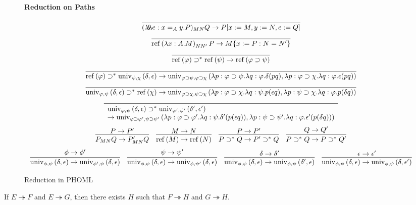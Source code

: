 \documentclass[a4paper,UKenglish]{lipics-v2016}
\newcommand*{\reff}[1]{\ensuremath{\mathrm{ref} \left( {#1} \right)}}
\newcommand*{\univ}[4]{\ensuremath{\mathrm{univ}_{{#1}, {#2}} \left({#3} , {#4} \right)}}
\newcommand*{\triplelambda}{\ensuremath{\lambda \!\! \lambda \!\! \lambda}}
\theoremstyle{plain}
\theoremstyle{definition}
\begin{document}
\begin{definition}
\begin{figure}
\paragraph*{Reduction on Paths}
$$\infer{(\triplelambda e:x =_A y.P)_{MN} Q \rightarrow P [x := M, y := N, e := Q]}{} $$
$$ \infer{\reff{\lambda x:A.M}_{N N'} P \rightarrow M \{ x:=P : N = N' \}}{} $$
$$ \infer{\reff{\varphi} \supset^* \reff{\psi} \rightarrow \reff{\varphi \supset \psi}}{} $$
$$ \infer{\reff{\varphi} \supset^* \univ{\psi}{\chi}{\delta}{\epsilon} \rightarrow 
\univ{\varphi \supset \psi}{\varphi \supset \chi}{\lambda p:\varphi \supset \psi. \lambda q : \varphi. \delta (pq)}{\lambda p : \varphi \supset \chi. \lambda q : \varphi. \epsilon (pq)}}{} $$
$$ \infer{\univ{\varphi}{\psi}{\delta}{\epsilon} \supset^* \reff{\chi} \rightarrow
\univ{\varphi \supset \chi}{\psi \supset \chi}{\lambda p : \varphi \supset \chi. \lambda q : \psi. p (\epsilon q)}{\lambda p:\psi \supset \chi. \lambda q : \varphi. p(\delta q)}}{} $$
$$ \infer{\begin{array}{l}
\univ{\varphi}{\psi}{\delta}{\epsilon} \supset^* \univ{\varphi'}{\psi'}{\delta'}{\epsilon'} \\
 \rightarrow
\univ{\varphi \supset \varphi'}{\psi \supset \psi'}{\lambda p : \varphi \supset \varphi'. \lambda q : \psi. \delta' (p(\epsilon q))}{\lambda p : \psi \supset \psi'. \lambda q : \varphi. \epsilon' (p (\delta q))}
\end{array}}{} $$
$$ \infer{P_{MN} Q \rightarrow P'_{MN} Q}{P \rightarrow P'} \quad
\infer{\reff{M} \rightarrow \reff{N}}{M \rightarrow N} \quad
\infer{P \supset^* Q \rightarrow P' \supset^* Q}{P \rightarrow P'} \quad
\infer{P \supset^* Q \rightarrow P \supset^* Q'}{Q \rightarrow Q'} $$
$$ \infer{\univ{\phi}{\psi}{\delta}{\epsilon} \rightarrow \univ{\phi'}{\psi}{\delta}{\epsilon}}{\phi \rightarrow \phi'}
\quad
\infer{\univ{\phi}{\psi}{\delta}{\epsilon} \rightarrow \univ{\phi}{\psi'}{\delta}{\epsilon}}{\psi \rightarrow \psi'}
\quad
\infer{\univ{\phi}{\psi}{\delta}{\epsilon} \rightarrow \univ{\phi}{\psi}{\delta'}{\epsilon}}{\delta \rightarrow \delta'}
\quad
\infer{\univ{\phi}{\psi}{\delta}{\epsilon} \rightarrow \univ{\phi}{\psi}{\delta}{\epsilon'}}{\epsilon \rightarrow \epsilon'} $$
\caption{Reduction in PHOML}
\label{fig:reduction}
\end{figure}
\end{definition}

\begin{lemma}[Confluence]
\label{lm:diamond}
If $E \twoheadrightarrow F$ and $E \twoheadrightarrow G$, then there exists $H$ such that $F \twoheadrightarrow H$ and $G \twoheadrightarrow H$.
\end{lemma}
\end{document}

